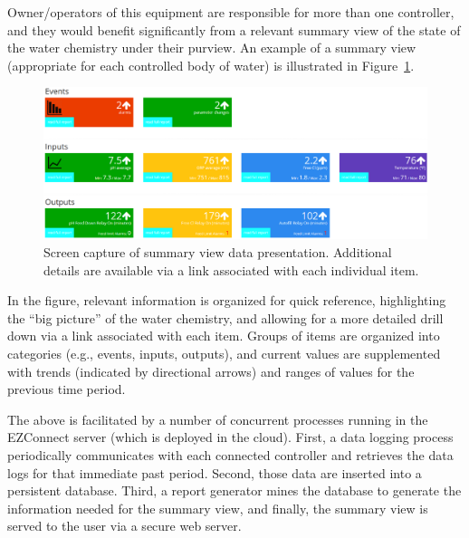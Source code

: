 Owner/operators of this equipment are responsible for 
more than one controller, and they would benefit significantly from a relevant
summary view of the state of the water chemistry under their purview.
An example of a summary view (appropriate for each controlled body of water)
is illustrated in Figure~\ref{screenshot}.

\begin{figure}[htbp]
 \center
\includegraphics[width=\columnwidth]{screenshot}
    \caption{Screen capture of summary view data presentation. Additional
details are available via a link associated with each individual item.}
    \label{screenshot}
\end{figure}

In the figure, relevant information is organized for quick reference,
highlighting the ``big picture'' of the water chemistry, and allowing for
a more detailed drill down via a link associated with each item.
Groups of items are organized into categories (e.g., events, inputs,
outputs), and current values are supplemented with trends (indicated
by directional arrows) and ranges of values for the previous time period.

The above is facilitated by a number of concurrent processes running
in the EZConnect server (which is deployed in the cloud).  First,
a data logging process periodically communicates with each connected
controller and retrieves the data logs for that immediate past period.
Second, those data are inserted into a persistent database.  Third,
a report generator mines the database to generate the information needed
for the summary view, and finally, the summary view is served to the
user via a secure web server.

